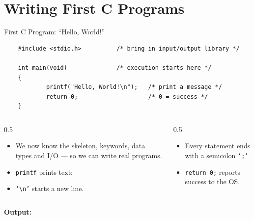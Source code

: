 \documentclass[aspectratio=169]{beamer}
\begin{document}
	\section{Writing First C Programs}
	\begin{frame}[fragile]{First C Program: ``Hello, World!''}
\begin{lstlisting}
	#include <stdio.h>          /* bring in input/output library */
	
	int main(void)              /* execution starts here */
	{
			printf("Hello, World!\n");   /* print a message */
			return 0;                    /* 0 = success */
	}
\end{lstlisting}
		\begin{columns}[T]
			\begin{column}{0.5\textwidth}
				\begin{itemize}\small
					\item We now know the skeleton, keywords, data types and I/O --- so we can write real programs.
					\item \texttt{printf} prints text; 
					\item \texttt{`\textbackslash n'} starts a new line.
				\end{itemize}
			\end{column}
			\begin{column}{0.5\textwidth}
				\begin{itemize}\small
					\item Every statement ends with a semicolon \texttt{`;'}
					\item \texttt{return 0;} reports success to the OS.
				\end{itemize}
			\end{column}
		\end{columns}
		\vspace{0.3cm}
		\centering\footnotesize\textbf{Output:}\; 
	\end{frame}
	
\end{document}
